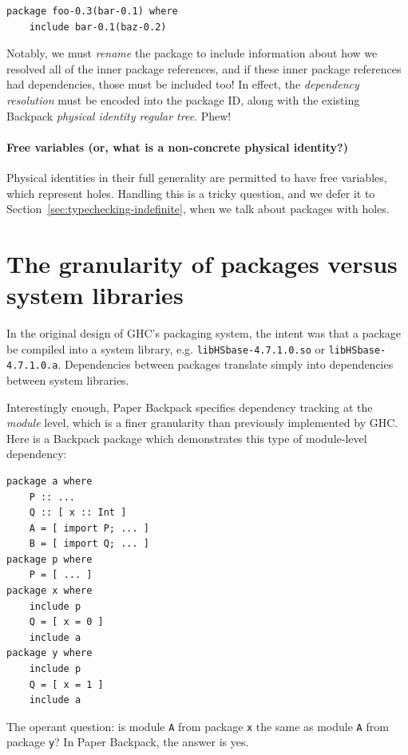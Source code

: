 \documentclass{article}
\begin{document}
\begin{verbatim}
package foo-0.3(bar-0.1) where
    include bar-0.1(baz-0.2)
\end{verbatim}

Notably, we must \emph{rename} the package to include information about
how we resolved all of the inner package references, and if these inner
package references had dependencies, those must be included too!  In
effect, the \emph{dependency resolution} must be encoded into the package ID,
along with the existing Backpack \emph{physical identity regular tree}.
Phew!

\paragraph{Free variables (or, what is a non-concrete physical
identity?)} Physical identities in their full generality are permitted
to have free variables, which represent holes.  Handling this is a
tricky question, and we defer it to Section~\ref{sec:typechecking-indefinite}, when
we talk about packages with holes.

\section{The granularity of packages versus system libraries}\label{sec:flatten}

In the original design of GHC's packaging system, the intent was that
a package be compiled into a system library, e.g. \verb|libHSbase-4.7.1.0.so|
or \verb|libHSbase-4.7.1.0.a|.  Dependencies between packages translate simply
into dependencies between system libraries.

Interestingly enough, Paper Backpack specifies dependency tracking at
the \emph{module} level, which is a finer granularity than previously
implemented by GHC\@.  Here is a Backpack package which demonstrates
this type of module-level dependency:

\begin{verbatim}
package a where
    P :: ...
    Q :: [ x :: Int ]
    A = [ import P; ... ]
    B = [ import Q; ... ]
package p where
    P = [ ... ]
package x where
    include p
    Q = [ x = 0 ]
    include a
package y where
    include p
    Q = [ x = 1 ]
    include a
\end{verbatim}

The operant question: is module
\verb|A| from package \verb|x| the same as module \verb|A| from package
\verb|y|?  In Paper Backpack, the answer is yes.
\end{document}
